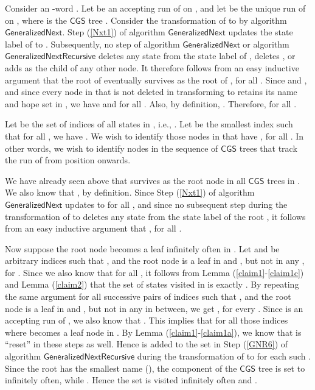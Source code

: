 \documentclass[3p]{elsarticle}
\newcommand{\CGS}{\ensuremath{\textsf{CGS }}}
\newcommand{\algo}[1]{\ensuremath{\textsf{{#1}}}}
\begin{document}
 Consider an -word .
Let  be an accepting run of
 on , and let  be the unique
run of  on , where  is the \CGS tree .  Consider the transformation of 
to  by algorithm \algo{GeneralizedNext}.  Step (\ref{Nxt1})
of algorithm \algo{GeneralizedNext} updates the state label of 
to .  Subsequently, no step of
algorithm \algo{GeneralizedNext} or algorithm
\algo{GeneralizedNextRecursive} deletes any state from the state label
of , deletes , or adds  as the child of any other node.
It therefore follows from an easy inductive argument that the root
 of  eventually survives as the root  of ,
for all .  Since  and , and
since every node in  that is not deleted in transforming  to
 retains its name and hope set in , we have
 and  for
all .  Also, by definition, .  Therefore,
 for all .

Let  be the set of indices of all states in , i.e., .  Let  be the smallest index
such that for all , we have .  We
wish to identify those nodes  in  that have , for all .  In other words, we wish to
identify nodes in the sequence of \CGS trees  that track the run  of  from position  onwards.  

We have already seen above that  survives as the root node in
all \CGS trees in .  We also know that ,
by definition.  Since Step (\ref{Nxt1}) of algorithm
\algo{GeneralizedNext} updates  to
 for all , and since no
subsequent step during the transformation of  to 
deletes any state from the state label of the root , it
follows from an easy inductive argument that , for all .

Now suppose the root node becomes a leaf infinitely often in
.  Let  and  be arbitrary indices such
that , and the root node is a leaf in  and
, but not in any , for .  Since we also know
that  for all , it follows
from Lemma (\ref{claim1}-\ref{claim1c}) and Lemma (\ref{claim2}) that
the set of states visited in  is exactly .  By repeating the same argument for all successive pairs of
indices  such that , and the root node is a
leaf in  and , but not in any  in between, we get
, for every .  Since  is an
accepting run of , we also know that .  This implies that  for all those
indices  where  becomes a leaf node in .  By Lemma (\ref{claim1}-\ref{claim1a}), we know that 
is ``reset'' in these steps as well.  Hence  is added to the set
 in Step (\ref{GNR6}) of algorithm \algo{GeneralizedNextRecursive}
during the transformation of  to  for each such .
Since the root has the smallest name (), the component
 of the \CGS tree  is set to  infinitely often, while
. Hence the set  is visited infinitely often and .
\end{document}
